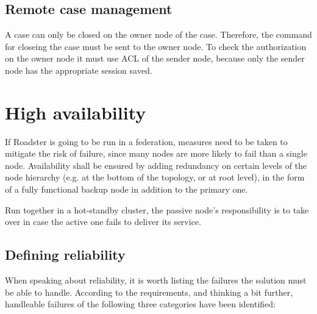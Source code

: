 

\subsection{Remote case management}
A case can only be closed on the owner node of the case. Therefore, the command
for closeing the case must be sent to the owner node. To check the authorization 
on the owner node it must use ACL of the sender node, because only
the sender node has the appropriate session saved.


\section{High availability}\label{sec:approach:ha}
If Roadster is going to be run in a federation, measures need to be taken to
mitigate the risk of failure, since many nodes are more likely to fail than a
single node. Availability shall be ensured by
adding redundancy on certain levels of the node hierarchy (e.g. at the bottom
of the topology, or at root level), in the form of a
fully functional backup node in addition to the primary one.

Run together in a hot-standby cluster, the passive node's responsibility is to
take over in case the active one fails to deliver its service.



\subsection{Defining reliability}
When speaking about reliability, it is worth listing the failures the solution must be
able to handle. According to the requirements, and thinking a bit further,
handleable failures of the following three categories have been identified:

